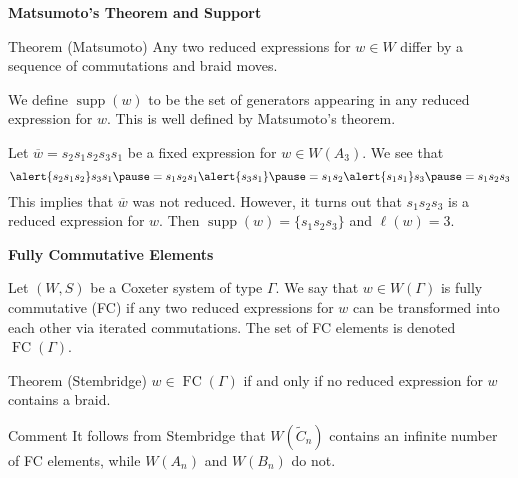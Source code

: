 \documentclass{beamer}
\newcommand{\w}{\overline{w}}
\DeclareMathOperator{\FC}{FC}
\newcommand{\C}{\widetilde{C}}
\DeclareMathOperator{\supp}{supp}
\begin{document}

\begin{frame}{\textbf{Matsumoto's Theorem and Support}}
\begin{block}{Theorem (Matsumoto)}
Any two reduced expressions for $w\in W$ differ by a sequence of commutations and braid moves.
\end{block}	

\pause

\begin{definition}
	We define $\supp(w)$ to be the set of generators appearing in any reduced expression for $w$. This is well defined by Matsumoto's theorem.
\end{definition}

\pause

\begin{example}
Let $\w=s_2s_1s_2s_3s_1$ be a fixed expression for $w \in W(A_3)$. We see that
\[\alert{s_2s_1s_2}s_3s_1 \pause =s_1s_2s_1\alert{s_3s_1} \pause =s_1s_2\alert{s_1s_1}s_3\pause=s_1s_2s_3\]	
This implies that $\w$ was not reduced. However, it turns out that $s_1s_2s_3$ is a reduced expression for $w$. Then $\supp(w)=\{s_1s_2s_3\}$ and $\ell(w)=3$.
\end{example}

\end{frame}


\begin{frame}{\textbf{Fully Commutative Elements}}
\begin{definition}
Let $(W,S)$ be a Coxeter system of type $\Gamma$. We say that $w \in W(\Gamma)$ is \alert{fully commutative} (\alert{FC}) if any two reduced expressions for $w$ can be transformed into each other via iterated commutations. The set of FC elements is denoted $\FC(\Gamma)$.	
\end{definition}

\begin{block}{Theorem (Stembridge)}
$w \in \FC(\Gamma)$ if and only if no reduced expression for $w$ contains a braid.
\end{block}

\begin{block}{Comment}
	It follows from Stembridge that $W(\C_n)$ contains an infinite number of FC elements, while $W(A_n)$ and $W(B_n)$ do not. 
\end{block}

\end{frame}
\end{document}
